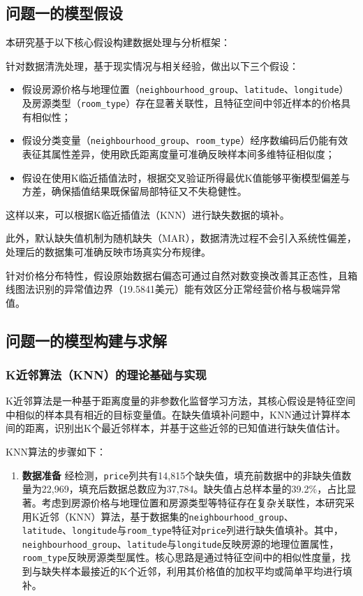 \documentclass[12pt]{article}
\begin{document}
\begin{CJK}{UTF8}{gbsn}
	\subsection{问题一的模型假设}
	本研究基于以下核心假设构建数据处理与分析框架：
	
	针对数据清洗处理，基于现实情况与相关经验，做出以下三个假设：
	
	\begin{itemize}
		\item 假设房源价格与地理位置（\texttt{neighbourhood\_group}、\texttt{latitude}、\texttt{longitude}）及房源类型（\texttt{room\_type}）存在显著关联性，且特征空间中邻近样本的价格具有相似性；
		\item 假设分类变量（\texttt{neighbourhood\_group}、\texttt{room\_type}）经序数编码后仍能有效表征其属性差异，使用欧氏距离度量可准确反映样本间多维特征相似度；
		\item 假设在使用K临近插值法时，根据交叉验证所得最优K值能够平衡模型偏差与方差，确保插值结果既保留局部特征又不失稳健性。
	\end{itemize}
	
	这样以来，可以根据K临近插值法（KNN）进行缺失数据的填补。
	
	此外，默认缺失值机制为随机缺失（MAR），数据清洗过程不会引入系统性偏差，处理后的数据集可准确反映市场真实分布规律。
	
	针对价格分布特性，假设原始数据右偏态可通过自然对数变换改善其正态性，且箱线图法识别的异常值边界（19.5841美元）能有效区分正常经营价格与极端异常值。
	
	\subsection{问题一的模型构建与求解}
	\subsubsection{K近邻算法（KNN）的理论基础与实现}
	K近邻算法是一种基于距离度量的非参数化监督学习方法，其核心假设是特征空间中相似的样本具有相近的目标变量值。在缺失值填补问题中，KNN通过计算样本间的距离，识别出K个最近邻样本，并基于这些近邻的已知值进行缺失值估计。
	
	KNN算法的步骤如下：
	
	\begin{enumerate}
		\item \textbf{数据准备}  
		经检测，\texttt{price}列共有14,815个缺失值，填充前数据中的非缺失值数量为22,969，填充后数据总数应为37,784。缺失值占总样本量的39.2\%，占比显著。考虑到房源价格与地理位置和房源类型等特征存在复杂关联性，本研究采用K近邻（KNN）算法，基于数据集的\texttt{neighbourhood\_group}、\\\texttt{latitude}、\texttt{longitude}与\texttt{room\_type}特征对\texttt{price}列进行缺失值填补。其中，\texttt{neighbourhood\_group}、\texttt{latitude}与\texttt{longitude}反映房源的地理位置属性，\texttt{room\_type}反映房源类型属性。核心思路是通过特征空间中的相似性度量，找到与缺失样本最接近的K个近邻，利用其价格值的加权平均或简单平均进行填补。
		

\end{enumerate}
\end{CJK}
\end{document}
